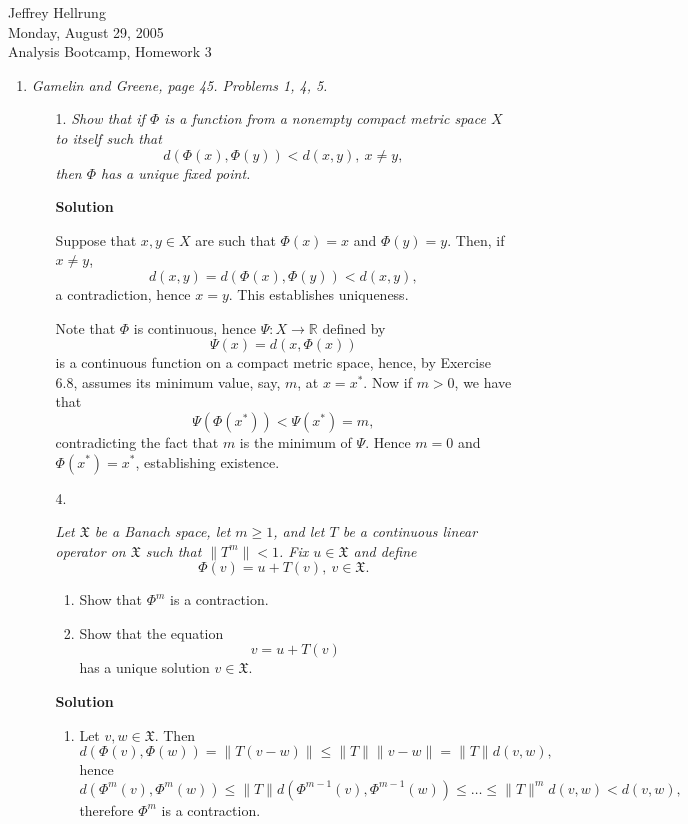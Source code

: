 \documentclass{article}
\begin{document}
\begin{flushright}
Jeffrey Hellrung \\
Monday, August 29, 2005 \\
Analysis Bootcamp, Homework 3 \\
\end{flushright}


\begin{enumerate}

\item {\em Gamelin and Greene, page 45.  Problems 1, 4, 5.}

\begin{itemize}

\item[1.] {\em Show that if \(\Phi\) is a function from a nonempty compact metric space \(X\) to itself such that
\[d(\Phi(x),\Phi(y)) < d(x,y), \ x \neq y,\]
then \(\Phi\) has a unique fixed point.}

{\bf Solution}

Suppose that \(x,y \in X\) are such that \(\Phi(x) = x\) and \(\Phi(y) = y\).  Then, if \(x \neq y\),
\[d(x,y) = d(\Phi(x),\Phi(y)) < d(x,y),\]
a contradiction, hence \(x = y\).  This establishes uniqueness.

Note that \(\Phi\) is continuous, hence \(\Psi : X \to \mathbb{R}\) defined by
\[\Psi(x) = d(x,\Phi(x))\]
is a continuous function on a compact metric space, hence, by Exercise 6.8, assumes its minimum value, say, \(m\), at \(x = x^*\).  Now if \(m > 0\), we have that
\[\Psi(\Phi(x^*)) < \Psi(x^*) = m,\]
contradicting the fact that \(m\) is the minimum of \(\Psi\).  Hence \(m = 0\) and \(\Phi(x^*) = x^*\), establishing existence.



\item[4.] {\em Let \(\mathfrak{X}\) be a Banach space, let \(m \geq 1\), and let \(T\) be a continuous linear operator on \(\mathfrak{X}\) such that \(\|T^m\| < 1\).  Fix \(u \in \mathfrak{X}\) and define
\[\Phi(v) = u + T(v), \ v \in \mathfrak{X}.\]
\begin{enumerate}
\item Show that \(\Phi^m\) is a contraction.
\item Show that the equation
\[v = u + T(v)\]
has a unique solution \(v \in \mathfrak{X}\).
\end{enumerate}}

{\bf Solution}

\begin{enumerate}
\item Let \(v,w \in \mathfrak{X}\).  Then
\[d(\Phi(v),\Phi(w))
     = \|T(v - w)\|
  \leq \|T\| \|v - w\|
     = \|T\| d(v,w),\]
hence
\[d(\Phi^m(v),\Phi^m(w))
  \leq \|T\| d(\Phi^{m-1}(v),\Phi^{m-1}(w))
  \leq \ldots
  \leq \|T\|^m d(v,w)
     < d(v,w),\]
therefore \(\Phi^m\) is a contraction.


\end{enumerate}
\end{itemize}
\end{enumerate}
\end{document}
